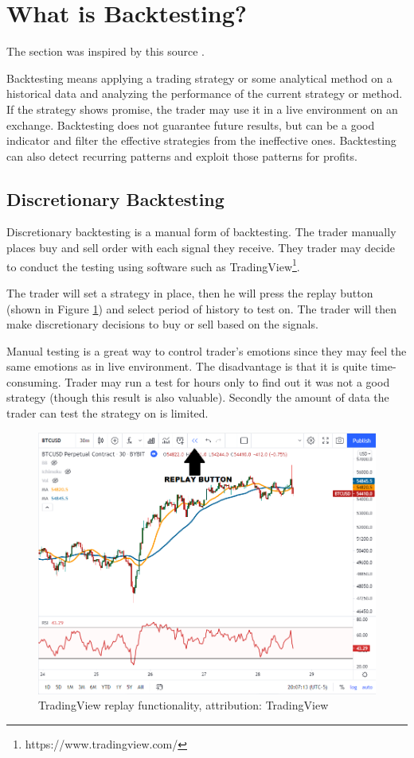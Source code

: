 \section{What is Backtesting?}
The section was inspired by this source \cite{backtesting-crypto-trading-strategies}. 

Backtesting means applying a trading strategy or some analytical method on a historical data and analyzing the performance of the current strategy or method. If the strategy shows promise, the trader may use it in a live environment on an exchange. Backtesting does not guarantee future results, but can be a good indicator and filter the effective strategies from the ineffective ones. Backtesting can also detect recurring patterns and exploit those patterns for profits.

\subsection*{Discretionary Backtesting}
Discretionary backtesting is a manual form of backtesting. The trader manually places buy and sell order with each signal they receive. They trader may decide to conduct the testing using software such as TradingView\footnote{https://www.tradingview.com/}.

The trader will set a strategy in place, then he will press the replay button (shown in Figure \ref{tradingview-figure}) and select period of history to test on. The trader will then make discretionary decisions to buy or sell based on the signals.

Manual testing is a great way to control trader's emotions since they may feel the same emotions as in live environment. The disadvantage is that it is quite time-consuming. Trader may run a test for hours only to find out it was not a good strategy (though this result is also valuable). Secondly the amount of data the trader can test the strategy on is limited.

\begin{figure}[ht]
    \centering
    \includegraphics[width=\columnwidth]{figures/tradingview-replay.png}
    \caption{TradingView replay functionality, attribution: TradingView \cite{backtesting-crypto-trading-strategies}}
    \label{tradingview-figure}
\end{figure}

